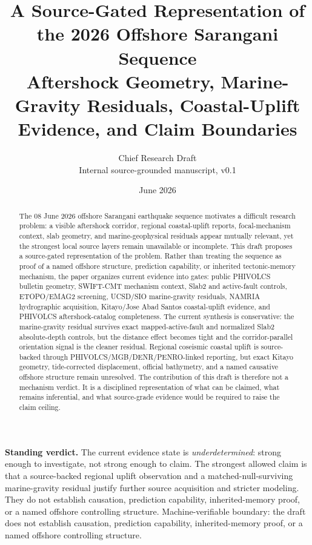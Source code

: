 \documentclass[11pt]{article}
\title{\textbf{A Source-Gated Representation of the 2026 Offshore Sarangani Sequence}\\[4pt]
\large Aftershock Geometry, Marine-Gravity Residuals, Coastal-Uplift Evidence, and Claim Boundaries}
\author{Chief Research Draft\\
\small Internal source-grounded manuscript, v0.1}
\date{June 2026}
\begin{document}
\maketitle

\begin{abstract}
The 08 June 2026 offshore Sarangani earthquake sequence motivates a difficult research problem: a visible aftershock corridor, regional coastal-uplift reports, focal-mechanism context, slab geometry, and marine-geophysical residuals appear mutually relevant, yet the strongest local source layers remain unavailable or incomplete. This draft proposes a source-gated representation of the problem. Rather than treating the sequence as proof of a named offshore structure, prediction capability, or inherited tectonic-memory mechanism, the paper organizes current evidence into gates: public PHIVOLCS bulletin geometry, SWIFT-CMT mechanism context, Slab2 and active-fault controls, ETOPO/EMAG2 screening, UCSD/SIO marine-gravity residuals, NAMRIA hydrographic acquisition, Kitayo/Jose Abad Santos coastal-uplift evidence, and PHIVOLCS aftershock-catalog completeness. The current synthesis is conservative: the marine-gravity residual survives exact mapped-active-fault and normalized Slab2 absolute-depth controls, but the distance effect becomes tight and the corridor-parallel orientation signal is the cleaner residual. Regional coseismic coastal uplift is source-backed through PHIVOLCS/MGB/DENR/PENRO-linked reporting, but exact Kitayo geometry, tide-corrected displacement, official bathymetry, and a named causative offshore structure remain unresolved. The contribution of this draft is therefore not a mechanism verdict. It is a disciplined representation of what can be claimed, what remains inferential, and what source-grade evidence would be required to raise the claim ceiling.
\end{abstract}

\begin{tcolorbox}[claimbox]
\textbf{Standing verdict.} The current evidence state is \emph{underdetermined}: strong enough to investigate, not strong enough to claim. The strongest allowed claim is that a source-backed regional uplift observation and a matched-null-surviving marine-gravity residual justify further source acquisition and stricter modeling. They do not establish causation, prediction capability, inherited-memory proof, or a named offshore controlling structure. Machine-verifiable boundary: the draft does not establish causation, prediction capability, inherited-memory proof, or a named offshore controlling structure.
\end{tcolorbox}
\end{document}
